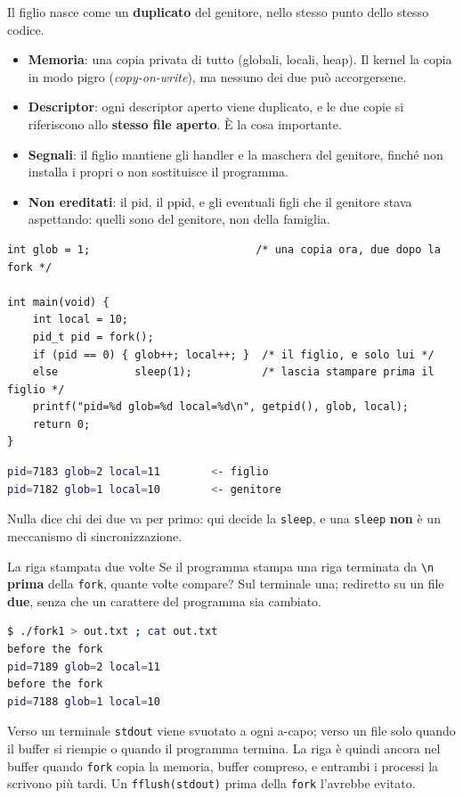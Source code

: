 Il figlio nasce come un \textbf{duplicato} del genitore, nello stesso punto dello stesso codice.
\begin{itemize}
    \item \textbf{Memoria}: una copia privata di tutto (globali, locali, heap). Il kernel la copia in modo pigro
          (\emph{copy-on-write}), ma nessuno dei due può accorgersene.
    \item \textbf{Descriptor}: ogni descriptor aperto viene duplicato, e le due copie si riferiscono allo \textbf{stesso
          file aperto}. È la cosa importante.
    \item \textbf{Segnali}: il figlio mantiene gli handler e la maschera del genitore, finché non installa i propri o non
          sostituisce il programma.
    \item \textbf{Non ereditati}: il pid, il ppid, e gli eventuali figli che il genitore stava aspettando: quelli sono del
          genitore, non della famiglia.
\end{itemize}

\begin{lstlisting}[language={[POSIX]C}, style=wnumbers, title={fork1.c: due copie delle stesse variabili}]
int glob = 1;                          /* una copia ora, due dopo la fork */

int main(void) {
    int local = 10;
    pid_t pid = fork();
    if (pid == 0) { glob++; local++; }  /* il figlio, e solo lui */
    else            sleep(1);           /* lascia stampare prima il figlio */
    printf("pid=%d glob=%d local=%d\n", getpid(), glob, local);
    return 0;
}
\end{lstlisting}

\begin{lstlisting}[language=bash]
pid=7183 glob=2 local=11        <- figlio
pid=7182 glob=1 local=10        <- genitore
\end{lstlisting}

Nulla dice chi dei due va per primo: qui decide la \texttt{sleep}, e una \texttt{sleep} \textbf{non} è un meccanismo di
sincronizzazione.

\begin{warningbox}{{La riga stampata due volte}}
    Se il programma stampa una riga terminata da \texttt{\textbackslash n} \textbf{prima} della \texttt{fork}, quante volte
    compare? Sul terminale una; rediretto su un file \textbf{due}, senza che un carattere del programma sia cambiato.
\begin{lstlisting}[language=bash]
$ ./fork1 > out.txt ; cat out.txt
before the fork
pid=7189 glob=2 local=11
before the fork
pid=7188 glob=1 local=10
\end{lstlisting}
    Verso un terminale \texttt{stdout} viene svuotato a ogni a-capo; verso un file solo quando il buffer si riempie o quando
    il programma termina. La riga è quindi ancora nel buffer quando \texttt{fork} copia la memoria, buffer compreso, e
    entrambi i processi la scrivono più tardi. Un \texttt{fflush(stdout)} prima della \texttt{fork} l'avrebbe evitato.
\end{warningbox}

